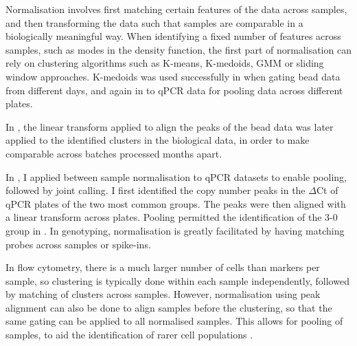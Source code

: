 Normalisation involves first matching certain features of the data across samples, and then transforming the data such that samples are comparable in a biologically meaningful way.
When identifying a fixed number of features across samples, such as modes in the density function, the first part of normalisation can rely on clustering algorithms such as K-means, K-medoids, \gls{GMM} or sliding window approaches.
K-medoids was used successfully in  when gating bead data from different days, and again in  to qPCR data for pooling data across different plates.

In , the linear transform applied to align the peaks of the bead data was later applied to the identified clusters in the biological data, in order to make  comparable across batches processed months apart.

In , I applied between sample normalisation to qPCR datasets to enable pooling, followed by joint calling.
I first identified the copy number peaks in the $\Delta$Ct of qPCR plates of the two most common groups.
The peaks were then aligned with a linear transform across plates.
Pooling permitted the identification of the 3-0 group in .
In genotyping, normalisation is greatly facilitated by having matching probes across samples or spike-ins.

In flow cytometry, there is a much larger number of cells than markers per sample, so clustering is typically done within each sample independently, followed by matching of clusters across samples.
However, normalisation using peak alignment can also be done to align samples before the clustering, so that the same gating can be applied to all normalised samples.
This allows for pooling of samples, to aid the identification of rarer cell populations \citep{Hahne:2009hl}.

